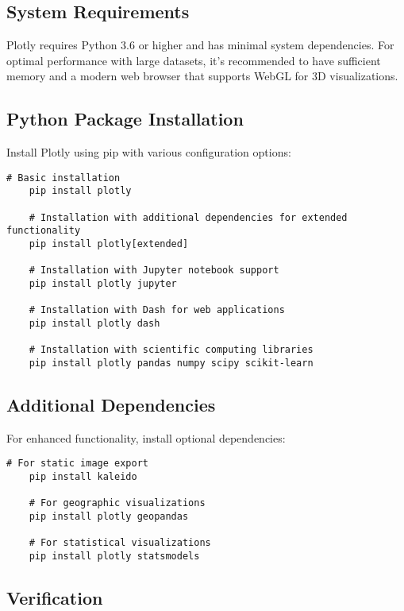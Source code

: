 \subsection{System Requirements}
\label{subsec:system_requirements}

Plotly requires Python 3.6 or higher and has minimal system dependencies. For optimal performance with large datasets, it's recommended to have sufficient memory and a modern web browser that supports WebGL for 3D visualizations.

\subsection{Python Package Installation}
\label{subsec:python_install}

Install Plotly using pip with various configuration options:

\begin{lstlisting}[style=bashstyle, caption={Plotly Installation}]
	# Basic installation
	pip install plotly
	
	# Installation with additional dependencies for extended functionality
	pip install plotly[extended]
	
	# Installation with Jupyter notebook support
	pip install plotly jupyter
	
	# Installation with Dash for web applications
	pip install plotly dash
	
	# Installation with scientific computing libraries
	pip install plotly pandas numpy scipy scikit-learn
\end{lstlisting}

\subsection{Additional Dependencies}
\label{subsec:additional_deps}

For enhanced functionality, install optional dependencies:

\begin{lstlisting}[style=bashstyle, caption={Optional Dependencies}]
	# For static image export
	pip install kaleido
	
	# For geographic visualizations
	pip install plotly geopandas
	
	# For statistical visualizations
	pip install plotly statsmodels
\end{lstlisting}

\subsection{Verification}
\label{subsec:verification}

